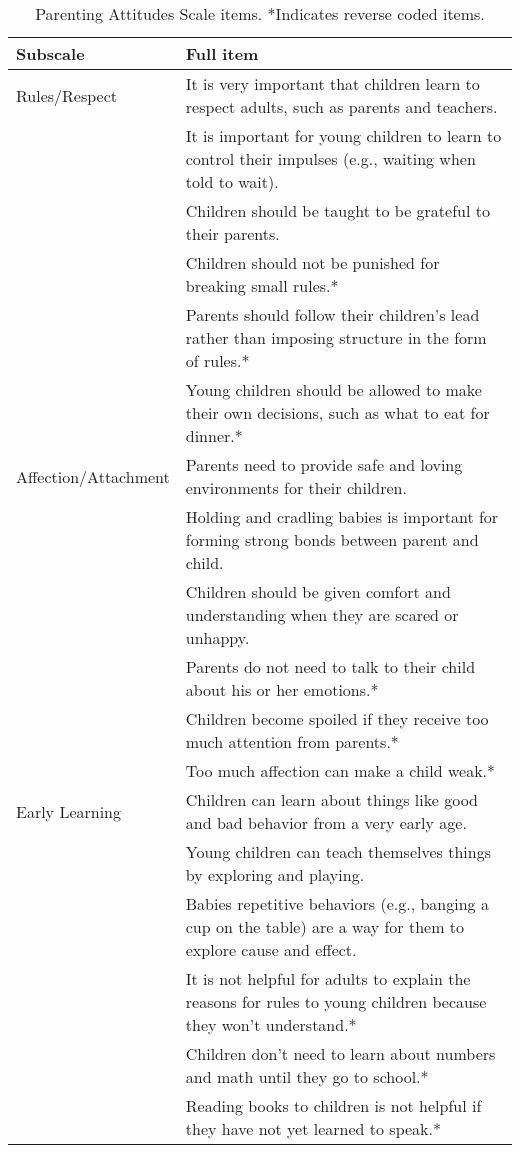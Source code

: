 \documentclass[10pt, letterpaper]{article}
\begin{document}
\begin{table*}[t]
\centering
\begin{tabular}{p{1.25in}p{5.25in}}
  \hline
Subscale & Full item \\ 
  \hline
Rules/Respect & It is very important that children learn to respect adults, such as parents and teachers. \\ 
   & It is important for young children to learn to control their impulses (e.g., waiting when told to wait). \\ 
  & Children should be taught to be grateful to their parents. \\ 
  & Children should not be punished for breaking small rules.* \\ 
  & Parents should follow their children's lead rather than imposing structure in the form of rules.* \\ 
  & Young children should be allowed to make their own decisions, such as what to eat for dinner.* \\ 
  \hline
  Affection/Attachment & Parents need to provide safe and loving environments for their children. \\ 
   & Holding and cradling babies is important for forming strong bonds between parent and child. \\ 
   & Children should be given comfort and understanding when they are scared or unhappy. \\ 
   & Parents do not need to talk to their child about his or her emotions.* \\ 
   & Children become spoiled if they receive too much attention from parents.* \\ 
   & Too much affection can make a child weak.* \\ 
   \hline
  Early Learning & Children can learn about things like good and bad behavior from a very early age. \\ 
   & Young children can teach themselves things by exploring and playing. \\ 
   & Babies repetitive behaviors (e.g., banging a cup on the table) are a way for them to explore cause and effect. \\ 
   & It is not helpful for adults to explain the reasons for rules to young children because they won't understand.* \\ 
   & Children don't need to learn about numbers and math until they go to school.* \\ 
   & Reading books to children is not helpful if they have not yet learned to speak.* \\ 
   \hline
\end{tabular}
\caption{Parenting Attitudes Scale items. *Indicates reverse coded items.\label{tab:items}}
\end{table*}
\end{document}
